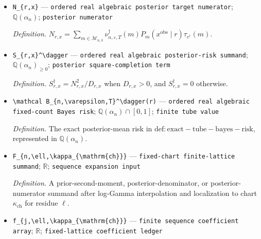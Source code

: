 \documentclass{article}
\begin{document}
\begin{itemize}
  \par\smallskip\noindent\emph{Definition.} \(D_{r,x}=\sum_{m\in\mathcal M_{n,3}}\nu_{n,\varepsilon,T}^\dagger(m)P_m(x^{\mathrm{obs}}\mid r)\).
  \item \texttt{N\_\allowbreak{}\{r,\allowbreak{}x\}\allowbreak{}} --- \texttt{ordered real algebraic posterior target numerator}; \(\mathbb Q(\alpha_n)\); \texttt{posterior numerator}
  \par\smallskip\noindent\emph{Definition.} \(N_{r,x}=\sum_{m\in\mathcal M_{n,3}}\nu_{n,\varepsilon,T}^\dagger(m)P_m(x^{\mathrm{obs}}\mid r)\tau_{c^\dagger}(m)\).
  \item \texttt{S\_\allowbreak{}\{r,\allowbreak{}x\}\allowbreak{}\textasciicircum{}\textbackslash{}\allowbreak{}dagger} --- \texttt{ordered real algebraic posterior-\allowbreak{}risk summand}; \(\mathbb Q(\alpha_n)_{\ge0}\); \texttt{posterior square-\allowbreak{}completion term}
  \par\smallskip\noindent\emph{Definition.} \(S_{r,x}^\dagger=N_{r,x}^2/D_{r,x}\) when \(D_{r,x}>0\), and \(S_{r,x}^\dagger=0\) otherwise.
  \item \texttt{\textbackslash{}\allowbreak{}mathcal B\_\allowbreak{}\{n,\allowbreak{}\textbackslash{}\allowbreak{}varepsilon,\allowbreak{}T\}\allowbreak{}\textasciicircum{}\textbackslash{}\allowbreak{}dagger(r)} --- \texttt{ordered real algebraic fixed-\allowbreak{}count Bayes risk}; \(\mathbb Q(\alpha_n)\cap[0,1]\); \texttt{finite tube value}
  \par\smallskip\noindent\emph{Definition.} The exact posterior-mean risk in \(\mathrm{def:exact-tube-bayes-risk}\), represented in \(\mathbb Q(\alpha_n)\).
  \item \texttt{F\_\allowbreak{}\{n,\allowbreak{}\textbackslash{}\allowbreak{}ell,\allowbreak{}\textbackslash{}\allowbreak{}kappa\_\allowbreak{}\{\textbackslash{}\allowbreak{}mathrm\{ch\}\allowbreak{}\}\allowbreak{}\}\allowbreak{}} --- \texttt{fixed-\allowbreak{}chart finite-\allowbreak{}lattice summand}; \(\mathbb R\); \texttt{sequence expansion input}
  \par\smallskip\noindent\emph{Definition.} A prior-second-moment, posterior-denominator, or posterior-numerator summand after log-Gamma interpolation and localization to chart \(\kappa_{\mathrm{ch}}\) for residue \(\ell\).
  \item \texttt{f\_\allowbreak{}\{j,\allowbreak{}\textbackslash{}\allowbreak{}ell,\allowbreak{}\textbackslash{}\allowbreak{}kappa\_\allowbreak{}\{\textbackslash{}\allowbreak{}mathrm\{ch\}\allowbreak{}\}\allowbreak{}\}\allowbreak{}} --- \texttt{finite sequence coefficient array}; \(\mathbb R\); \texttt{fixed-\allowbreak{}lattice coefficient ledger}

\end{itemize}
\end{document}
